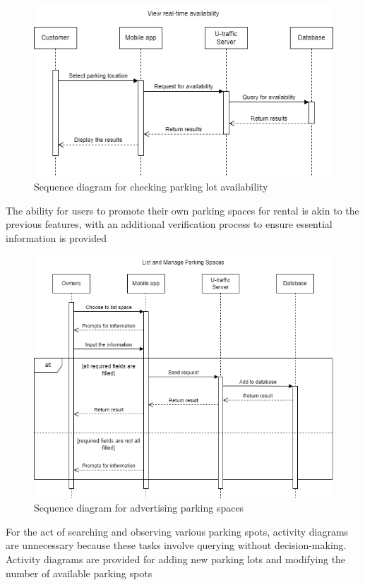 \begin{figure}[H]
    \centering
    \includegraphics[width=\linewidth]{assets/images/Implementation/Parking/Availability.drawio.png}
    \caption{Sequence diagram for checking parking lot availability}
    \label{fig:parking_availability}
\end{figure}

The ability for users to promote their own parking spaces for rental is akin to the previous features, with an additional verification process to ensure essential information is provided

\begin{figure}[H]
    \centering
    \includegraphics[width=0.8\linewidth]{assets/images/Implementation/Parking/List and Manage.drawio.png}
    \caption{Sequence diagram for advertising parking spaces}
    \label{fig:parking_search}
\end{figure}


For the act of searching and observing various parking spots, activity diagrams are unnecessary because these tasks involve querying without decision-making. Activity diagrams are provided for adding new parking lots and modifying the number of available parking spots

